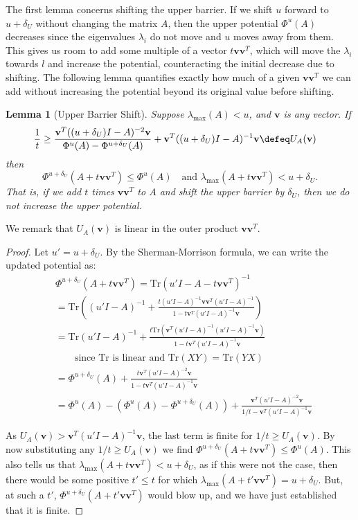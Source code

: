 \documentclass[12pt]{article}
\renewcommand{\v}{\mathbf{v}}
\newtheorem{lemma}[theorem]{Lemma}
\renewcommand{\v}{\mathbf{v}}
\newcommand{\lmax}{\lambda_\mathrm{max}}
\newcommand{\deltaU}{\delta_{U}}
\newcommand{\tr}{\mathrm{Tr}}
\newcommand\ppi{\mathbf{v}}
\begin{document}
The first lemma concerns shifting the upper barrier. If we shift $u$ forward to
  $u+\deltaU$ without changing the matrix $A$, then the upper potential
  $\Phi^u(A)$ decreases since the eigenvalues $\lambda_i$ do not move and $u$ moves away from
  them.
This gives us room to add some multiple of a vector $t\v\v^T$, which will
  move the $\lambda_i$ towards $l$ and increase the potential, counteracting the
  initial decrease due to shifting.
The following lemma quantifies exactly how much of a given $\v\v^T$ we can add
  without increasing the potential beyond its original value before shifting.

\begin{lemma}[Upper Barrier Shift]\label{lem:upperupd} Suppose $\lmax(A)<u$,
  and $\ppi$ is any vector. If 
\begin{align*} \frac{1}{t} &\ge \frac{
  \ppi^{T} ((u+\deltaU)I-A)^{-2}\ppi}
  {\Phi^u(A)-\Phi^{u+\deltaU}(A)}
  +\ppi^{T} ((u+\deltaU)I-A)^{-1}\ppi
  \defeq U_A(\ppi)\end{align*}
then 
\[ \Phi^{u+\deltaU}(A+t\ppi\ppi^{T} )\le\Phi^u(A)\quad\textrm{and $\lmax(A+t\ppi\ppi^{T} )< u+\deltaU$}.\]
That is, if we add $t$ times $\ppi\ppi^{T} $ to $A$ and shift the upper barrier
by $\deltaU$, then we do not increase the upper potential.
\end{lemma}
\noindent We remark that $U_{A} (\ppi)$ is linear in the outer product $\v \v^{T}$.
\begin{proof}
Let $u'=u+\deltaU$. By the Sherman-Morrison formula, we can write the updated
potential as:
\begin{align*}
&\Phi^{u+\deltaU}(A+t\ppi\ppi^{T} )=\tr(u'I-A-t\ppi\ppi^{T} )^{-1}
\\&=\tr\left((u'I-A)^{-1}+\frac{t(u'I-A)^{-1}\ppi\ppi^{T} (u'I-A)^{-1}}{1-t\ppi^{T} (u'I-A)^{-1}\ppi}\right)
\\&=\tr(u'I-A)^{-1}+\frac{t\tr(\ppi^{T} (u'I-A)^{-1}(u'I-A)^{-1}\ppi)}{1-t\ppi^{T} (u'I-A)^{-1}\ppi}
\\&\qquad\textrm{since $\tr$ is linear and $\tr(XY)=\tr(YX)$}
\\&=\Phi^{u+\deltaU}(A)+\frac{t\ppi^{T} (u'I-A)^{-2}\ppi}{1-t\ppi^{T} (u'I-A)^{-1}\ppi}
\\&=\Phi^{u}(A)-(\Phi^{u}(A)-\Phi^{u+\deltaU}(A))
  +\frac{\ppi^{T} (u'I-A)^{-2}\ppi}{1/t-\ppi^{T} (u'I-A)^{-1}\ppi}
\end{align*}

As $U_{A} (\ppi) > \ppi^{T} (u'I-A)^{-1}\ppi$,
  the last term is finite for $1/t \geq U_{A} (\ppi)$.
By now substituting any 
  $1/t\ge U_A(\ppi)$ we find
  $\Phi^{u+\deltaU}(A+t\ppi\ppi^{T} )\le \Phi^u(A)$.
This also tells us that $\lmax(A+t\ppi \ppi ^T) < u + \deltaU$, 
  as if this were not the case, then there would be some positive
  $t' \leq t$ for which $\lmax(A+t' \ppi \ppi ^T) = u + \deltaU$.
But, at such a $t'$, $\Phi^{u+\deltaU} (A + t' \ppi \ppi ^T)$
  would blow up, and we have just established that it is finite.
\end{proof}
\end{document}
